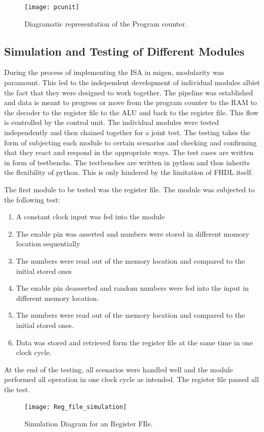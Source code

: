 \begin{figure}[p]
\texttt{[image: pcunit]}
\centering
\caption{Diagramatic representation of the Program counter.}
\centering
\label{fig:pcunit}
\end{figure}

\subsection{Simulation and Testing of Different Modules}
During the process of implementing the ISA in migen, modularity was paramount. This led to the independent development of individual modules albiet the fact that they were designed to work together. The pipeline was established and data is meant to progress or move from the program counter to the RAM to the decoder to the register file to the ALU and back to the register file. This flow is controlled by the control unit. 
The individual modules were tested independently and then chained together for a joint test. The testing takes the form of subjecting each module to certain scenarios and checking and confirming that they react and respond in the appropriate ways. The test cases are written in form of testbenchs. The testbenches are written in python and thus inherits the flexibility of python. This is only hindered by the limitation of FHDL itself.

The first module to be tested was the register file. The module was subjected to the following test:
\begin{enumerate}
\item A constant clock input was fed into the module
\item The enable pin was asserted and numbers were stored in different momory location sequentially
\item The numbers were read out of the memory location and compared to the initial stored ones
\item The enable pin deasserted and random numbers were fed into the input in different memory location.
\item The numbers were read out of the memory location and compared to the initial stored ones.
\item Data was stored and retrieved form the register file at the same time in one clock cycle.

\end{enumerate}
At the end of the testing, all scenarios were handled well and the module performed all operation in one clock cycle as intended. The register file passed all the test.
\begin{figure}[p]
    \centering
    \texttt{[image: Reg\_file\_simulation]}
	\caption{Simulation Diagram for an Register FIle.}
    \label{fig:reg_sim}
\end{figure}

